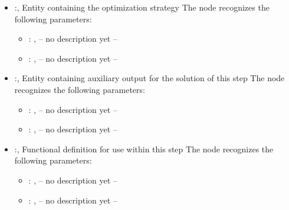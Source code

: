 \begin{itemize}
    \item {}:, 
      Entity containing the optimization strategy
      The  node recognizes the following parameters:
        \begin{itemize}
          \item {}: , 
            -- no description yet --
          \item {}: , 
            -- no description yet --
      \end{itemize}

    \item {}:, 
      Entity containing auxiliary output for the solution of this step
      The  node recognizes the following parameters:
        \begin{itemize}
          \item {}: , 
            -- no description yet --
          \item {}: , 
            -- no description yet --
      \end{itemize}

    \item {}:, 
      Functional definition for use within this step
      The  node recognizes the following parameters:
        \begin{itemize}
          \item {}: , 
            -- no description yet --
          \item {}: , 
            -- no description yet --
      \end{itemize}
  \end{itemize}
